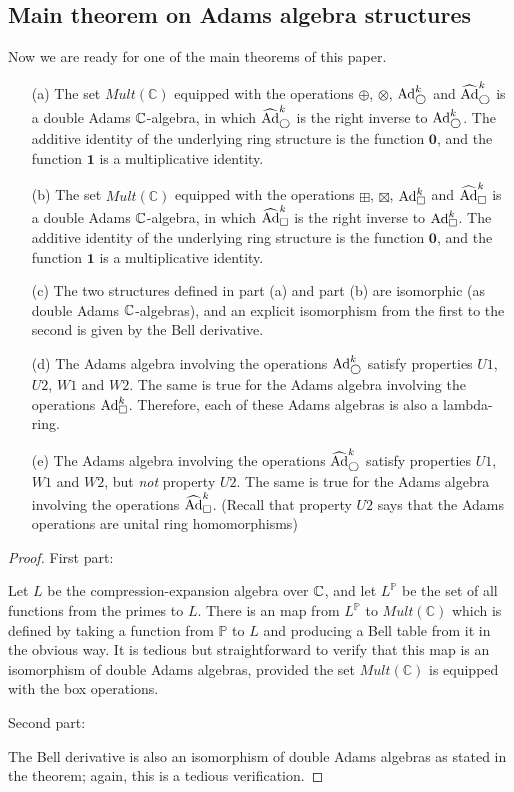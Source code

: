 \subsection{Main theorem on Adams algebra structures}

Now we are ready for one of the main theorems of this paper.


\begin{theorem}
\begin{itemize}
\item[(a)] The set $Mult(\mathbb{C})$ equipped with the operations $\oplus$, $\otimes$, $\text{Ad}^{k}_{\bigcirc}$ and $\widehat{\text{Ad}}^{k}_{\bigcirc}$ is a double Adams $\mathbb{C}$-algebra, in which $\widehat{\text{Ad}}^{k}_{\bigcirc}$ is the right inverse to $\text{Ad}^{k}_{\bigcirc}$. The additive identity of the underlying ring structure is the function $\mathbf{0}$, and the function $\mathbf{1}$ is a multiplicative identity. 
\item[(b)] The set $Mult(\mathbb{C})$ equipped with the operations $\boxplus$, $\boxtimes$, $\text{Ad}^{k}_{\square}$ and $\widehat{\text{Ad}}^{k}_{\square}$ is a double Adams $\mathbb{C}$-algebra, in which $\widehat{\text{Ad}}^{k}_{\square}$ is the right inverse to $\text{Ad}^{k}_{\square}$. The additive identity of the underlying ring structure is the function $\mathbf{0}$, and the function $\mathbf{1}$ is a multiplicative identity. 
\item[(c)] The two structures defined in part (a) and part (b) are isomorphic (as double Adams $\mathbb{C}$-algebras), and an explicit isomorphism from the first to the second is given by the Bell derivative. 
\item[(d)] The Adams algebra involving the operations $\text{Ad}^{k}_{\bigcirc}$ satisfy properties $U1$, $U2$, $W1$ and $W2$. The same is true for the Adams algebra involving the operations $\text{Ad}^{k}_{\square}$. Therefore, each of these Adams algebras is also a lambda-ring.
\item[(e)] The Adams algebra involving the operations $\widehat{\text{Ad}}^{k}_{\bigcirc}$ satisfy properties $U1$, $W1$ and $W2$, but \emph{not} property $U2$. The same is true for the Adams algebra involving the operations $\widehat{\text{Ad}}^{k}_{\square}$. (Recall that property $U2$ says that the Adams operations are unital ring homomorphisms)
\end{itemize}
\end{theorem}
\begin{proof}
First part:

Let $L$ be the compression-expansion algebra over $\mathbb{C}$, and let $L^{\mathbb{P}}$ be the set of all functions from the primes to $L$. There is an map from $L^{\mathbb{P}}$ to $Mult(\mathbb{C})$ which is defined by taking a function from $\mathbb{P}$ to $L$ and producing a Bell table from it in the obvious way. It is tedious but straightforward to verify that this map is an isomorphism of double Adams algebras, provided the set $Mult(\mathbb{C})$ is equipped with the box operations. 

Second part:

The Bell derivative is also an isomorphism of double Adams algebras as stated in the theorem; again, this is a tedious verification. 


\end{proof}




